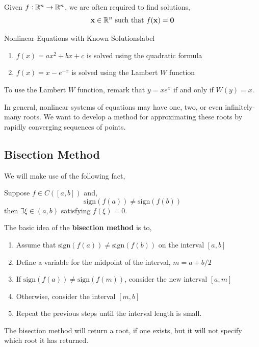 \noindent Given $f: \mathbb{R}^n \rightarrow \mathbb{R}^n$, we are often required to find solutions,
\[\mathbf{x} \in \mathbb{R}^n \text{ such that } f(\mathbf{x}) = \mathbf{0}\]
\begin{ex}{Nonlinear Equations with Known Solutions}{label}
\begin{enumerate}
    \item $f(x) = ax^2 + bx + c$ is solved using the quadratic formula
    \item $f(x) = x - e^{-x}$ is solved using the Lambert $W$ function
\end{enumerate}
\end{ex}

\begin{marginfigure}
    To use the Lambert $W$ function, remark that $y = xe^x$ if and only if $W(y) = x$.
\end{marginfigure}

\noindent In general, nonlinear systems of equations may have one, two, or even infinitely-many roots. We want to develop a method for approximating these roots by rapidly converging sequences of points. 

\subsection{Bisection Method}
We will make use of the following fact,

\begin{lem}
    Suppose $f \in C([a, b])$ and,
    \[\text{sign}(f(a)) \neq \text{sign}(f(b))\]
    then $\exists \xi \in (a, b)$ satisfying $f(\xi) = 0$.
\end{lem}

\noindent The basic idea of the \textbf{bisection method} is to,
\begin{enumerate}
    \item Assume that $\text{sign}(f(a)) \neq \text{sign}(f(b))$ on the interval $[a,b]$
    \item Define a variable for the midpoint of the interval, $m = a+b/2$
    \item If $\text{sign}(f(a)) \neq \text{sign}(f(m))$, consider the new interval $[a, m]$
    \item Otherwise, consider the interval $[m, b]$
    \item Repeat the previous steps until the interval length is small.
\end{enumerate}

\begin{rmk}
    The bisection method will return a root, if one exists, but it will not specify which root it has returned.
\end{rmk}

